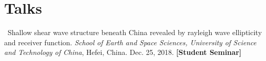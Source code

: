 \section*{Talks}
\begin{etaremune}
\item
    \Me\
    Shallow shear wave structure beneath China revealed by rayleigh wave ellipticity and receiver function.
    \textit{School of Earth and Space Sciences, University of Science and Technology of China}, Hefei, China.
    Dec. 25, 2018.
    \textbf{[Student Seminar]}
\end{etaremune}
